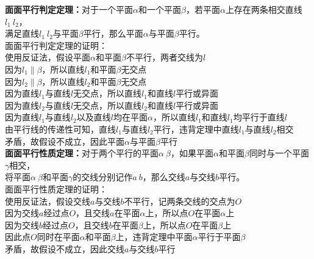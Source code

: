 \documentclass[UTF8]{ctexart}
\begin{document}
\newpage

    \textbf{面面平行判定定理：}对于一个平面$\alpha$和一个平面$\beta$，若平面$\alpha$上存在两条相交直线$l_1~l_2$，\\
    满足直线$l_1~l_2$与平面$\beta$平行，那么平面$\alpha$与平面$\beta$平行。\\[4mm]
    面面平行判定定理的证明：\\[3mm]
    使用反证法，假设平面$\alpha$和平面$\beta$不平行，两者交线为$l$\\[3mm]
    因为$l_1\parallel\beta$，所以直线$l_1$和平面$\beta$无交点\\[3mm]
    因为$l_2\parallel\beta$，所以直线$l_2$和平面$\beta$无交点\\[3mm]
    因为直线$l_1$与直线$l$无交点，所以直线$l_1$和直线$l$平行或异面\\[3mm]
    因为直线$l_2$与直线$l$无交点，所以直线$l_2$和直线$l$平行或异面\\[3mm]
    因为直线$l_1$与直线$l_2$以及直线$l$均在平面$\alpha$，所以直线$l_1$和直线$l_1$均平行于直线$l$\\[3mm]
    由平行线的传递性可知，直线$l_1$与直线$l_2$平行，违背定理中直线$l_1$与直线$l_2$相交\\[3mm]
    矛盾，故假设不成立，因此平面$\alpha$与平面$\beta$平行\\[10mm]
    \textbf{面面平行性质定理：}对于两个平行的平面$\alpha~\beta$，如果平面$\alpha$和平面$\beta$同时与一个平面$\gamma$相交，\\
    将平面$\alpha~\beta$和平面$\gamma$的交线分别记作$a~b$，那么交线$a$与交线$b$平行。\\[4mm]
    面面平行性质定理的证明：\\[3mm]
    使用反证法，假设交线$a$与交线$b$不平行，记两条交线的交点为$O$\\[3mm]
    因为交线$a$经过点$O$，且交线$a$在平面$\alpha$上，所以点$O$在平面$\alpha$上\\[3mm]
    因为交线$b$经过点$O$，且交线$b$在平面$\beta$上，所以点$O$在平面$\beta$上\\[3mm]
    因此点$O$同时在平面$\alpha$和平面$\beta$上，违背定理中平面$\alpha$平行于平面$\beta$\\[3mm]
    矛盾，故假设不成立，因此交线$a$与交线$b$平行

\newpage
\end{document}
